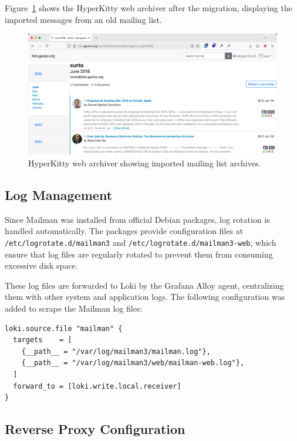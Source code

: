 Figure~\ref{fig:mailman-ui} shows the HyperKitty web archiver after the migration, displaying the imported messages from an old mailing list.

\begin{figure}[h!]
	\centering
	\includegraphics[width=\textwidth]{imaxes/hyperkitty-ui.png}
	\caption{HyperKitty web archiver showing imported mailing list archives.}
	\label{fig:mailman-ui}
\end{figure}

\subsection*{Log Management}

Since Mailman was installed from official Debian packages, log rotation is handled automatically. The packages provide configuration files at \texttt{/etc/logrotate.d/mailman3} and \texttt{/etc/logrotate.d/mailman3-web}, which ensure that log files are regularly rotated to prevent them from consuming excessive disk space.

These log files are forwarded to Loki by the Grafana Alloy agent, centralizing them with other system and application logs. The following configuration was added to scrape the Mailman log files:

\begin{lstlisting}[caption={Grafana Alloy configuration to forward Mailman logs to Loki.}]
loki.source.file "mailman" {
  targets    = [
    {__path__ = "/var/log/mailman3/mailman.log"},
    {__path__ = "/var/log/mailman3/web/mailman-web.log"},
  ]
  forward_to = [loki.write.local.receiver]
}
\end{lstlisting}

\subsection*{Reverse Proxy Configuration}

